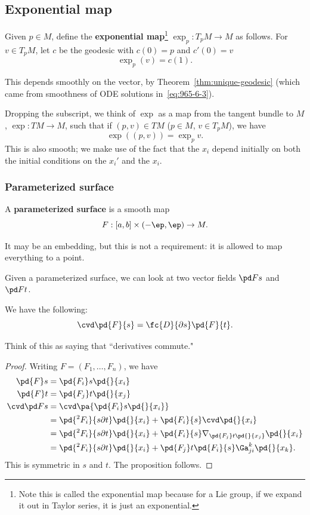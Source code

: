 \subsection{Exponential map}
\begin{df}
Given $p\in M$, define the \textbf{exponential map}\footnote{Note this is called the exponential map because for a Lie group, if we expand it out in Taylor series, it is just an exponential.} $\exp_p:T_pM\to M$ as follows. For $v\in T_pM$, let $c$ be the geodesic with $c(0)=p$ and $c'(0)=v$
\[
\exp_p(v)=c(1).
\]
\end{df}
This depends smoothly on the vector, by Theorem~\ref{thm:unique-geodesic} (which came from smoothness of ODE solutions in~\eqref{eq:965-6-3}).


Dropping the subscript, we think of $\exp$ as a map from the tangent bundle to $M$, $\exp:TM\to M$, such that if $(p,v)\in TM$ ($p\in M$, $v\in T_pM$), we have
\[
\exp((p,v))=\exp_pv.
\]
This is also smooth; we make use of the fact that the $x_i$ depend initially on both the initial conditions on the $x_i'$ and the $x_i$.

\subsubsection{Parameterized surface}
\begin{df}
A \textbf{parameterized surface} is a smooth map
\[
F:[a,b]\times(-\ep,\ep)\to M.
\]
\end{df}
It may be an embedding, but this is not a requirement: it is allowed to map everything to a point.


Given a parameterized surface, we can look at two vector fields $\pd Fs$ and $\pd Ft$. 


\begin{pr}
We have the following:
\[
\cvd \pd{F}{s}=\fc{D}{\partial s}\pd{F}{t}.
\]
\end{pr}
Think of this as saying that ``derivatives commute."
\begin{proof}
Writing $F=(F_1,\ldots, F_n)$, we have
\begin{align*}
\pd{F}s&=\pd{F_i}s \pd{}{x_i}\\ 
\pd{F}t&=\pd{F_j}t \pd{}{x_j}\\
\cvd \pd Fs &=\cvd \pa{\pd{F_i}s\pd{}{x_i}}\\
&=\pd{^2F_i}{s\partial t}\pd{}{x_i}+\pd{F_i}{s}\cvd \pd{}{x_i}\\
&=\pd{^2F_i}{s\partial t}\pd{}{x_i}+\pd{F_i}{s}\nabla_{\pd{F_j}t\pd{}{x_j}} \pd{}{x_i}\\
&=\pd{^2F_i}{s\partial t}\pd{}{x_i}+\pd{F_j}t\pd{F_i}{s}\Ga_{ji}^k\pd{}{x_k}.
\end{align*}
This is symmetric in $s$ and $t$. The proposition follows.
\end{proof}



